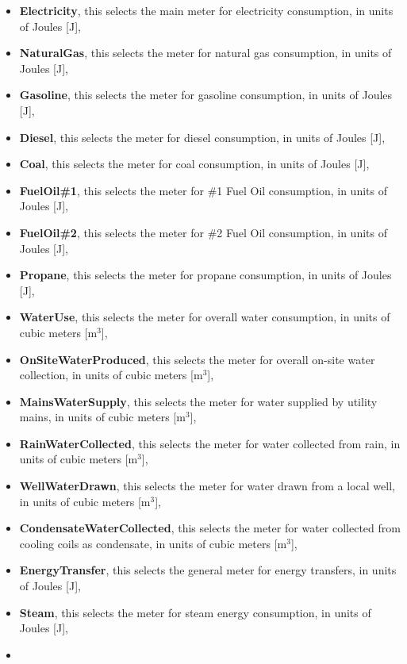 \begin{itemize}
\item
  \textbf{Electricity}, this selects the main meter for electricity consumption, in units of Joules {[}J{]},
\item
  \textbf{NaturalGas}, this selects the meter for natural gas consumption, in units of Joules {[}J{]},
\item
  \textbf{Gasoline}, this selects the meter for gasoline consumption, in units of Joules {[}J{]},
\item
  \textbf{Diesel}, this selects the meter for diesel consumption, in units of Joules {[}J{]},
\item
  \textbf{Coal}, this selects the meter for coal consumption, in units of Joules {[}J{]},
\item
  \textbf{FuelOil\#1}, this selects the meter for \#1 Fuel Oil consumption, in units of Joules {[}J{]},
\item
  \textbf{FuelOil\#2}, this selects the meter for \#2 Fuel Oil consumption, in units of Joules {[}J{]},
\item
  \textbf{Propane}, this selects the meter for propane consumption, in units of Joules {[}J{]},
\item
  \textbf{WaterUse}, this selects the meter for overall water consumption, in units of cubic meters {[}m\(^{3}\){]},
\item
  \textbf{OnSiteWaterProduced}, this selects the meter for overall on-site water collection, in units of cubic meters {[}m\(^{3}\){]},
\item
  \textbf{MainsWaterSupply}, this selects the meter for water supplied by utility mains, in units of cubic meters {[}m\(^{3}\){]},
\item
  \textbf{RainWaterCollected}, this selects the meter for water collected from rain, in units of cubic meters {[}m\(^{3}\){]},
\item
  \textbf{WellWaterDrawn}, this selects the meter for water drawn from a local well, in units of cubic meters {[}m\(^{3}\){]},
\item
  \textbf{CondensateWaterCollected}, this selects the meter for water collected from cooling coils as condensate, in units of cubic meters {[}m\(^{3}\){]},
\item
  \textbf{EnergyTransfer}, this selects the general meter for energy transfers, in units of Joules {[}J{]},
\item
  \textbf{Steam}, this selects the meter for steam energy consumption, in units of Joules {[}J{]},
\item

\end{itemize}
